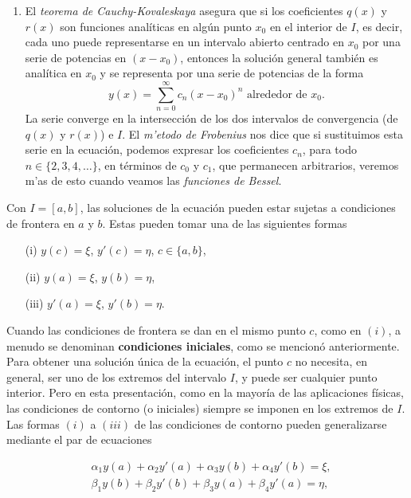 \documentclass[main.tex]{subfiles}
\begin{document}
\begin{enumerate}
    \item El \emph{teorema de Cauchy-Kovaleskaya} asegura que si los coeficientes \(q(x)\) y \(r(x)\) son funciones analíticas en algún punto \(x_0\) en el interior de \(I\), es decir, cada uno puede representarse en un intervalo abierto centrado en \(x_0\) por una serie de potencias en \((x-x_0)\), entonces la solución general también es analítica en \(x_0\) y se representa por una serie de potencias de la forma
    \[
    y(x)=\sum_{n=0}^\infty c_n (x - x_0)^n\text{ alrededor de }x_{0}.
    \]
    La serie converge en la intersección de los dos intervalos de convergencia (de \(q(x)\) y \(r(x)\)) e \(I\). El \emph{m'etodo de Frobenius} nos dice que si sustituimos esta serie en la ecuación, podemos expresar los coeficientes \(c_n\), para todo \(n\in\{2, 3, 4,\dots\}\), en términos de \(c_0\) y \(c_1\), que permanecen arbitrarios, veremos m'as de esto cuando veamos las \emph{funciones de Bessel}.
\end{enumerate}

Con \( I = [a, b] \), las soluciones de la ecuación pueden estar sujetas a condiciones de frontera en \(a\) y \(b\). Estas pueden tomar una de las siguientes formas

\begin{enumerate}
    \item[(i)] \( y(c) = \xi \), \( y'(c) = \eta \), \( c \in \{a, b\} \),
    \item[(ii)] \( y(a) = \xi \), \( y(b) = \eta \),
    \item[(iii)] \( y'(a) = \xi \), \( y'(b) = \eta \).
\end{enumerate}

Cuando las condiciones de frontera se dan en el mismo punto \(c\), como en \((i)\), a menudo se denominan \textbf{condiciones iniciales}, como se mencionó anteriormente. Para obtener una solución única de la ecuación, el punto \(c\) no necesita, en general, ser uno de los extremos del intervalo \(I\), y puede ser cualquier punto interior. Pero en esta presentación, como en la mayoría de las aplicaciones físicas, las condiciones de contorno (o iniciales) siempre se imponen en los extremos de \(I\). Las formas \((i)\) a \((iii)\) de las condiciones de contorno pueden generalizarse mediante el par de ecuaciones

\begin{align*}
&\alpha_1 y(a) + \alpha_2 y'(a) + \alpha_3 y(b) + \alpha_4 y'(b) = \xi,\\
&\beta_1 y(b) + \beta_2 y'(b) + \beta_3 y(a) + \beta_4 y'(a) = \eta,
\end{align*}
\end{document}
